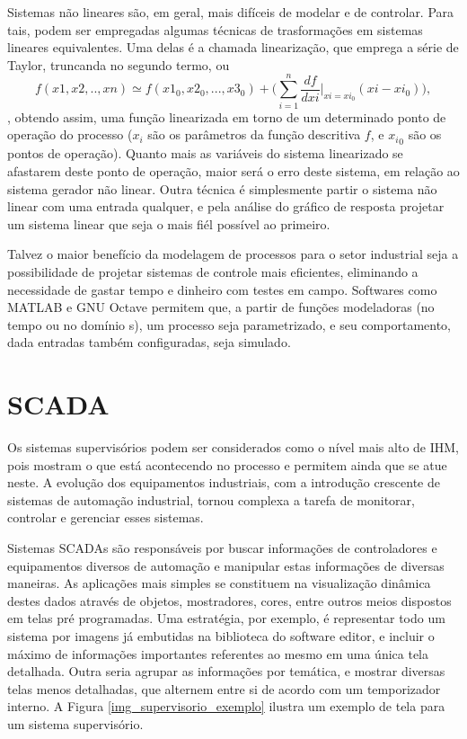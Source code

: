 Sistemas não lineares são, em geral, mais difíceis de modelar e de controlar. Para tais, podem ser empregadas algumas técnicas de trasformações em sistemas lineares equivalentes. Uma delas é a chamada linearização, que emprega a série de Taylor, truncanda no segundo termo, ou
\begin{equation}
f(x1, x2, .. , xn) \simeq f(x1_0, x2_0, ..., x3_0) + \bigg( \sum_{i=1}^n \frac{df}{dxi}\big|_{xi=xi_0} (xi - xi_0) \bigg),
\end{equation}
, obtendo assim, uma função linearizada em torno de um determinado ponto de operação do processo ($x_i$ são os parâmetros da função descritiva $f$, e ${x_i}_0$ são os pontos de operação). Quanto mais as variáveis do sistema linearizado se afastarem deste ponto de operação, maior será o erro deste sistema, em relação ao sistema gerador não linear. Outra técnica é simplesmente partir o sistema não linear com uma entrada qualquer, e pela análise do gráfico de resposta projetar um sistema linear que seja o mais fiél possível ao primeiro.

Talvez o maior benefício da modelagem de processos para o setor industrial seja a possibilidade de projetar sistemas de controle mais eficientes, eliminando a necessidade de gastar tempo e dinheiro com testes em campo. Softwares como MATLAB e GNU Octave permitem que, a partir de funções modeladoras (no tempo ou no domínio s), um processo seja parametrizado, e seu comportamento, dada entradas também configuradas, seja simulado.

\section{SCADA}

Os sistemas supervisórios podem ser considerados como o nível mais alto de IHM, pois mostram o que está acontecendo no processo e permitem ainda que se atue neste. A evolução dos equipamentos industriais, com a introdução crescente de sistemas de automação industrial, tornou complexa a tarefa de monitorar, controlar e gerenciar esses sistemas. \cite{Martins2007}

Sistemas SCADAs são responsáveis por buscar informações de controladores e equipamentos diversos de automação e manipular estas informações de diversas maneiras. As aplicações mais simples se constituem na visualização dinâmica destes dados através de objetos, mostradores, cores, entre outros meios dispostos em telas pré programadas. Uma estratégia, por exemplo, é representar todo um sistema por imagens já embutidas na biblioteca do software editor, e incluir o máximo de informações importantes referentes ao mesmo em uma única tela detalhada. Outra seria agrupar as informações por temática, e mostrar diversas telas menos detalhadas, que alternem entre si de acordo com um temporizador interno. A Figura \ref{img_supervisorio_exemplo} ilustra um exemplo de tela para um sistema supervisório.

